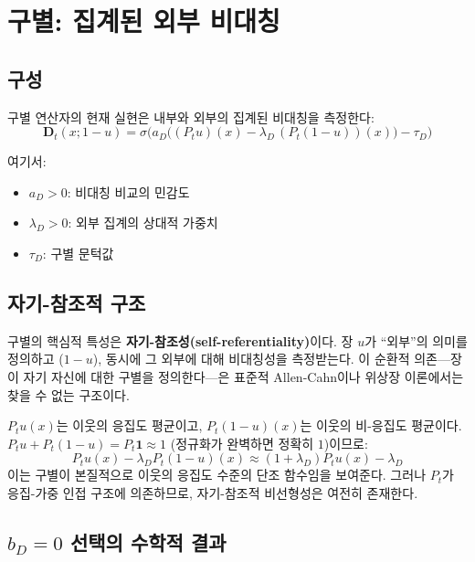 \section{구별: 집계된 외부 비대칭}
\label{sec:distinction-realization}

\subsection{구성}

구별 연산자의 현재 실현은 내부와 외부의 집계된 비대칭을 측정한다:
\begin{equation}
    \mathbf{D}_t(x; 1-u) = \sigma\!\Big( a_D \big( (P_t u)(x) - \lambda_D\, (P_t(1-u))(x) \big) - \tau_D \Big)
    \label{eq:distinction}
\end{equation}

여기서:
\begin{itemize}
    \item $a_D > 0$: 비대칭 비교의 민감도
    \item $\lambda_D > 0$: 외부 집계의 상대적 가중치
    \item $\tau_D$: 구별 문턱값
\end{itemize}

\subsection{자기-참조적 구조}

구별의 핵심적 특성은 \textbf{자기-참조성(self-referentiality)}이다. 장 $u$가 ``외부''의 의미를 정의하고 ($1 - u$), 동시에 그 외부에 대해 비대칭성을 측정받는다. 이 순환적 의존---장이 자기 자신에 대한 구별을 정의한다---은 표준적 Allen-Cahn이나 위상장 이론에서는 찾을 수 없는 구조이다.

$P_t u(x)$는 이웃의 응집도 평균이고, $P_t(1-u)(x)$는 이웃의 비-응집도 평균이다. $P_t u + P_t(1-u) = P_t \mathbf{1} \approx 1$ (정규화가 완벽하면 정확히 $1$)이므로:
\begin{equation}
    P_t u(x) - \lambda_D P_t(1-u)(x) \approx (1 + \lambda_D) P_t u(x) - \lambda_D
\end{equation}
이는 구별이 본질적으로 이웃의 응집도 수준의 단조 함수임을 보여준다. 그러나 $P_t$가 응집-가중 인접 구조에 의존하므로, 자기-참조적 비선형성은 여전히 존재한다.

\subsection{$b_D = 0$ 선택의 수학적 결과}

